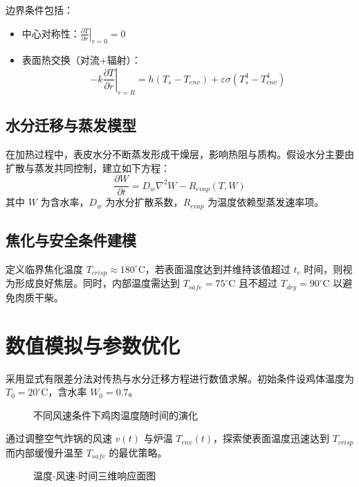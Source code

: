 \documentclass[12pt]{article}
\begin{document}
边界条件包括：
\begin{itemize}
\item 中心对称性：$\left.\frac{\partial T}{\partial r}\right|_{r=0} = 0$
\item 表面热交换（对流+辐射）：
\begin{equation}
-k \left.\frac{\partial T}{\partial r}\right|_{r=R} = h(T_s - T_{env}) + \varepsilon \sigma(T_s^4 - T_{env}^4)
\end{equation}
\end{itemize}

\subsection{水分迁移与蒸发模型}
在加热过程中，表皮水分不断蒸发形成干燥层，影响热阻与质构。假设水分主要由扩散与蒸发共同控制，建立如下方程：
\begin{equation}
\frac{\partial W}{\partial t} = D_w \nabla^2 W - R_{evap}(T, W)
\end{equation}
其中 $W$ 为含水率，$D_w$ 为水分扩散系数，$R_{evap}$ 为温度依赖型蒸发速率项。

\subsection{焦化与安全条件建模}
定义临界焦化温度 $T_{crisp} \approx 180^\circ$C，若表面温度达到并维持该值超过 $t_c$ 时间，则视为形成良好焦层。同时，内部温度需达到 $T_{safe} = 75^\circ$C 且不超过 $T_{dry} = 90^\circ$C 以避免肉质干柴。

\section{数值模拟与参数优化}
采用显式有限差分法对传热与水分迁移方程进行数值求解。初始条件设鸡体温度为 $T_0 = 20^\circ$C，含水率 $W_0 = 0.7$。

\begin{figure}[htbp]
\centering
\caption{不同风速条件下鸡肉温度随时间的演化}
\end{figure}

通过调整空气炸锅的风速 $v(t)$ 与炉温 $T_{env}(t)$，探索使表面温度迅速达到 $T_{crisp}$ 而内部缓慢升温至 $T_{safe}$ 的最优策略。

\begin{figure}[htbp]
\centering
\caption{温度-风速-时间三维响应面图}
\end{figure}
\end{document}
